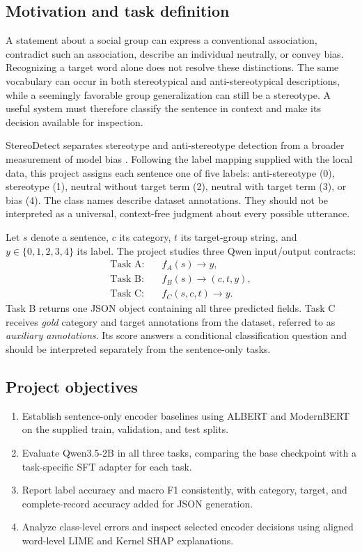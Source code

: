 \subsection{Motivation and task definition}
A statement about a social group can express a conventional association, contradict such an association, describe an individual neutrally, or convey bias. Recognizing a target word alone does not resolve these distinctions. The same vocabulary can occur in both stereotypical and anti-stereotypical descriptions, while a seemingly favorable group generalization can still be a stereotype. A useful system must therefore classify the sentence in context and make its decision available for inspection.

StereoDetect separates stereotype and anti-stereotype detection from a broader measurement of model bias \citep{shejole2025}. Following the label mapping supplied with the local data, this project assigns each sentence one of five labels: anti-stereotype (0), stereotype (1), neutral without target term (2), neutral with target term (3), or bias (4). The class names describe dataset annotations. They should not be interpreted as a universal, context-free judgment about every possible utterance.

Let $s$ denote a sentence, $c$ its category, $t$ its target-group string, and $y\in\{0,1,2,3,4\}$ its label. The project studies three Qwen input/output contracts:
\begin{align}
\text{Task A:}\quad & f_A(s)\longrightarrow y,\\
\text{Task B:}\quad & f_B(s)\longrightarrow (c,t,y),\\
\text{Task C:}\quad & f_C(s,c,t)\longrightarrow y.
\end{align}
Task B returns one JSON object containing all three predicted fields. Task C receives \emph{gold} category and target annotations from the dataset, referred to as \emph{auxiliary annotations}. Its score answers a conditional classification question and should be interpreted separately from the sentence-only tasks.

\subsection{Project objectives}
\begin{enumerate}
\item Establish sentence-only encoder baselines using ALBERT and ModernBERT on the supplied train, validation, and test splits.
\item Evaluate Qwen3.5-2B in all three tasks, comparing the base checkpoint with a task-specific SFT adapter for each task.
\item Report label accuracy and macro F1 consistently, with category, target, and complete-record accuracy added for JSON generation.
\item Analyze class-level errors and inspect selected encoder decisions using aligned word-level LIME and Kernel SHAP explanations.
\end{enumerate}

